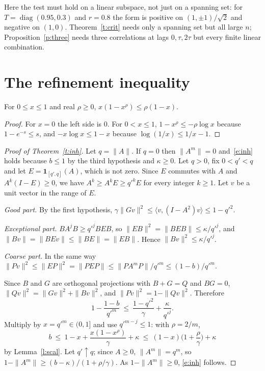 \begin{remark}\label{r:three}
Here the test must hold on a linear subspace, not just on a spanning set: for $T=\operatorname{diag}(0.95,0.3)$
and $r=0.8$ the form is positive on $(1,\pm1)/\sqrt2$ and negative on $(1,0)$. Theorem~\ref{t:crit} needs only a
spanning set but all large $n$; Proposition~\ref{p:three} needs three correlations at lags $0,\tau,2\tau$ but
every finite linear combination.
\end{remark}

\section{The refinement inequality}\label{s:inh}
\begin{lemma}\label{l:scal}
For $0\le x\le1$ and real $\rho\ge0$, $x(1-x^\rho)\le\rho(1-x)$.
\end{lemma}
\begin{proof}
For $x=0$ the left side is $0$. For $0<x\le1$, $1-x^\rho\le-\rho\log x$ because $1-e^{-s}\le s$, and
$-x\log x\le1-x$ because $\log(1/x)\le1/x-1$.
\end{proof}

\begin{proof}[Proof of Theorem~\ref{t:inh}]
Let $q=\|A\|$. If $q=0$ then $\|A^m\|=0$ and~\eqref{e:inh} holds because $b\le1$ by the third hypothesis and
$\kappa\ge0$. Let $q>0$, fix $0<q'<q$ and let $E=\mathbf 1_{[q',q]}(A)$, which is not zero. Since $E$ commutes
with $A$ and $A^k(I-E)\ge0$, we have $A^k\ge A^kE\ge q'^kE$ for every integer $k\ge1$. Let $v$ be a unit
vector in the range of $E$.

\emph{Good part.} By the first hypothesis, $\gamma\|Gv\|^2\le\langle v,(I-A^2)v\rangle\le1-q'^2$.

\emph{Exceptional part.} $BA^jB\ge q'^jBEB$, so $\|EB\|^2=\|BEB\|\le\kappa/q'^j$, and
$\|Bv\|=\|BEv\|\le\|BE\|=\|EB\|$. Hence $\|Bv\|^2\le\kappa/q'^j$.

\emph{Coarse part.} In the same way $\|Pv\|^2\le\|EP\|^2=\|PEP\|\le\|PA^mP\|/q'^m\le(1-b)/q'^m$.

Since $B$ and $G$ are orthogonal projections with $B+G=Q$ and $BG=0$, $\|Qv\|^2=\|Gv\|^2+\|Bv\|^2$, and
$\|Pv\|^2=1-\|Qv\|^2$. Therefore
\[
1-\frac{1-b}{q'^m}\ \le\ \frac{1-q'^2}{\gamma}+\frac{\kappa}{q'^j} .
\]
Multiply by $x=q'^m\in(0,1]$ and use $q'^{m-j}\le1$: with $\rho=2/m$,
\[
b\ \le\ 1-x+\frac{x(1-x^{\rho})}{\gamma}+\kappa\ \le\ (1-x)\Big(1+\frac{\rho}{\gamma}\Big)+\kappa
\]
by Lemma~\ref{l:scal}. Let $q'\uparrow q$; since $A\ge0$, $\|A^m\|=q^m$, so
$1-\|A^m\|\ge(b-\kappa)/(1+\rho/\gamma)$. As $1-\|A^m\|\ge0$, \eqref{e:inh} follows.
\end{proof}

